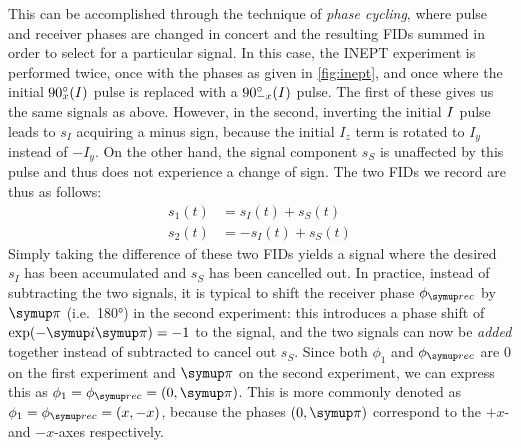 This can be accomplished through the technique of \textit{phase cycling}, where pulse and receiver phases are changed in concert and the resulting FIDs summed in order to select for a particular signal.
In this case, the INEPT experiment is performed twice, once with the phases as given in \cref{fig:inept}, and once where the initial $\angang{90}{x}(I)$ pulse is replaced with a $\angang{90}{-x}(I)$ pulse.
The first of these gives us the same signals as above.
However, in the second, inverting the initial $I\/$ pulse leads to $s_I$ acquiring a minus sign, because the initial $I_z$ term is rotated to $I_y$ instead of $-I_y$.
On the other hand, the signal component $s_S$ is unaffected by this pulse and thus does not experience a change of sign.
The two FIDs we record are thus as follows:
\begin{align}
    \label{eq:inept_phase_cycling}
    s_1(t) &= s_I(t) + s_S(t) \\
    s_2(t) &= -s_I(t) + s_S(t)
\end{align}
Simply taking the difference of these two FIDs yields a signal where the desired $s_I$ has been accumulated and $s_S$ has been cancelled out.
In practice, instead of subtracting the two signals, it is typical to shift the receiver phase $\phirec$ by $\cpi$ (i.e.\ \ang{180}) in the second experiment: this introduces a phase shift of $\exp(-\mi\cpi) = -1$ to the signal, and the two signals can now be \textit{added} together instead of subtracted to cancel out $s_S$.
Since both $\phi_1$ and $\phirec$ are $0$ on the first experiment and $\cpi$ on the second experiment, we can express this as $\phi_1 = \phirec = (0, \cpi)$.
This is more commonly denoted as $\phi_1 = \phirec = (x, -x)$, because the phases $(0, \cpi)$ correspond to the $+x$- and $-x$-axes respectively.

